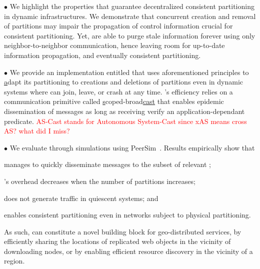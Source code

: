 \begin{asparadesc} %
\item [$\bullet$] We highlight the properties that guarantee
  decentralized consistent partitioning in dynamic infrastructures. We
  demonstrate that concurrent creation and removal of partitions may
  impair the propagation of control information crucial for consistent
  partitioning. Yet, \processes are able to purge stale information
  forever using only neighbor-to-neighbor communication, hence leaving
  room for up-to-date information propagation, and eventually
  consistent partitioning.
  
\item [$\bullet$] We provide an implementation entitled \NAME that
  uses aforementioned principles to \underline{a}dapt its partitioning
  to creations and deletions of partitions even in dynamic systems
  where \nodes can join, leave, or crash at any time. \NAME's
  efficiency relies on a communication primitive called
  \underline{s}coped-broad\underline{cast} that enables epidemic
  dissemination of messages as long as receiving \processes verify an
  application-dependant predicate.
  \textcolor{red}{AS-Cast stands for Autonomous System-Cast since xAS means cross AS? what did I miss?}

\item [$\bullet$] We evaluate \NAME through simulations using
  PeerSim~\cite{montresor2009peersim}. Results empirically show that
  \begin{inparaenum}[(i)]
  \item \NAME manages to quickly disseminate messages to the subset of
    relevant \processes;
  \item \NAME's overhead decreases when the number of partitions
    increases;
  \item \NAME does not generate traffic in quiescent systems; and
  \item \NAME enables consistent partitioning even in networks subject
    to physical partitioning.
  \end{inparaenum}
\end{asparadesc}

As such, \NAME can constitute a novel building block for
geo-distributed services, \eg by efficiently sharing the locations of
replicated web objects in the vicinity of downloading nodes, or by
enabling efficient resource discovery in the vicinity of a region.

